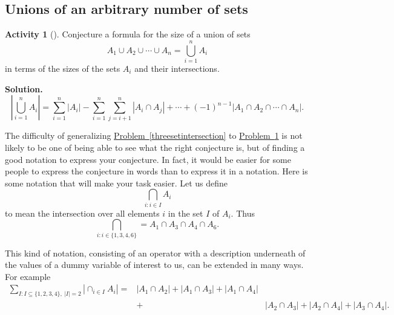 \documentclass[10pt,]{book}
\theoremstyle{plain}
\theoremstyle{definition}
\newtheorem{activity}[project]{Activity}
\numberwithin{equation}{chapter}
\newcommand{\amp}{&}
\begin{document}
\subsection[{Unions of an arbitrary number of sets}]{Unions of an arbitrary number of sets}\label{subsection-52}
\begin{activity}[]\label{nsetintersection}
Conjecture a formula for the size of a union of sets%
\begin{equation*}
A_1\cup
A_2\cup \cdots\cup A_n = \bigcup_{i=1}^n A_i
\end{equation*}
in terms of the sizes of the sets \(A_i\) and their intersections.%
\par\medskip\noindent%
\textbf{Solution.}\quad %
\begin{equation*}
\left|\bigcup_{i=1}^n A_i\right| = \sum_{i=1}^n|A_i| -
\sum_{i=1}^n\sum_{j=i+1}^n |A_i \cap A_j| + \cdots +(-1)^{n-1} |A_1\cap
A_2\cap\cdots \cap A_n|.
\end{equation*}
\end{activity}
The difficulty of generalizing \hyperref[threesetintersection]{Problem~\ref{threesetintersection}} to \hyperref[nsetintersection]{Problem~\ref{nsetintersection}} is not likely to be one of being able to see what the right conjecture is, but of finding a good notation to express your conjecture. In fact, it would be easier for some people to express the conjecture in words than to express it in a notation. Here is some notation that will make your task easier. Let us define%
\begin{equation*}
\bigcap_{i:i\in I}A_i
\end{equation*}
to mean the intersection over all elements \(i\) in the set \(I\) of \(A_i\). Thus%
\begin{equation}
\bigcap_{i:i\in
\{1,3,4,6\}} = A_1\cap A_3\cap A_4 \cap A_6.\label{intersectionnotation}
\end{equation}
%
\par
This kind of notation, consisting of an operator with a description underneath of the values of a dummy variable of interest to us, can be extended in many ways. For example%
\begin{align*}
\sum_{I:I \subseteq \{1,2,3,4\}, \ |I|=2} |\cap_{i\in I}
A_i|  =\amp  |A_1\cap A_2|+ |A_1\cap A_3|
+|A_1\cap A_4|\nonumber\\
\amp +\amp  |A_2\cap A_3|+
|A_2\cap A_4| +|A_3\cap A_4|.
\end{align*}
%
\end{document}
